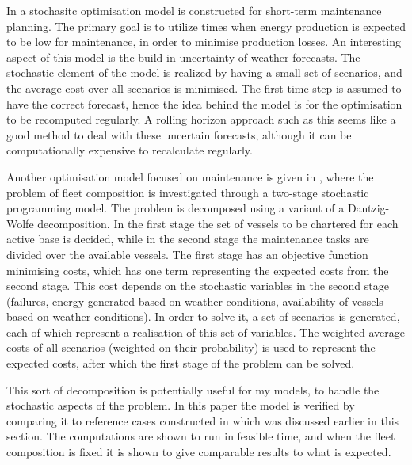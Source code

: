 \documentclass[a4paper,12pt]{article}
\begin{document}
\bigskip

In \cite{besnard2011stochastic} a stochasitc optimisation model is constructed for short-term maintenance planning. The primary goal is to utilize times when energy production is expected to be low for maintenance, in order to minimise production losses. An interesting aspect of this model is the build-in uncertainty of weather forecasts. The stochastic element of the model is realized by having a small set of scenarios, and the average cost over all scenarios is minimised. The first time step is assumed to have the correct forecast, hence the idea behind the model is for the optimisation to be recomputed regularly. A rolling horizon approach such as this seems like a good method to deal with these uncertain forecasts, although it can be computationally expensive to recalculate regularly. 

\bigskip

Another optimisation model focused on maintenance is given in \cite{staalhane2019optimizing}, where the problem of fleet composition is investigated through a two-stage stochastic programming model. The problem is decomposed using a variant of a Dantzig-Wolfe decomposition. In the first stage the set of vessels to be chartered for each active base is decided, while in the second stage the maintenance tasks are divided over the available vessels. The first stage has an objective function minimising costs, which has one term representing the expected costs from the second stage. This cost depends on the stochastic variables in the second stage (failures, energy generated based on weather conditions, availability of vessels based on weather conditions). In order to solve it, a set of scenarios is generated, each of which represent a realisation of this set of variables. The weighted average costs of all scenarios (weighted on their probability) is used to represent the expected costs, after which the first stage of the problem can be solved. 

This sort of decomposition is potentially useful for my models, to handle the stochastic aspects of the problem. In this paper the model is verified by comparing it to reference cases constructed in \cite{dinwoodie2015reference} which was discussed earlier in this section. The computations are shown to run in feasible time, and when the fleet composition is fixed it is shown to give comparable results to what is expected.
\end{document}
